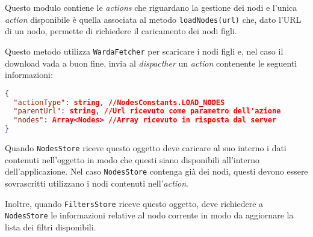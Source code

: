 Questo modulo contiene le \textit{actions} che riguardano la gestione dei nodi e l'unica \textit{action} disponibile è quella associata al metodo \texttt{loadNodes(url)} che, dato l'URL di un nodo, permette di richiedere il caricamento dei nodi figli.

Questo metodo utilizza \texttt{WardaFetcher} per scaricare i nodi figli e, nel caso il download vada a buon fine, invia al \textit{dispacther} un \textit{action} contenente le seguenti informazioni:
\begin{lstlisting}[language=JSON, caption=Action - load nodes]
{
  "actionType": string, //NodesConstants.LOAD_NODES
  "parentUrl": string, //Url ricevuto come parametro dell'azione
  "nodes": Array<Nodes> //Array ricevuto in risposta dal server
}
\end{lstlisting}

Quando \texttt{NodesStore} riceve questo oggetto deve caricare al suo interno i dati contenuti nell'oggetto in modo che questi siano disponibili all'interno dell'applicazione. Nel caso \texttt{NodesStore} contenga già dei nodi, questi devono essere sovrascritti utilizzano i nodi contenuti nell'\textit{action}.

Inoltre, quando \texttt{FiltersStore} riceve questo oggetto, deve richiedere a \texttt{NodesStore} le informazioni relative al nodo corrente in modo da aggiornare la lista dei filtri disponibili.